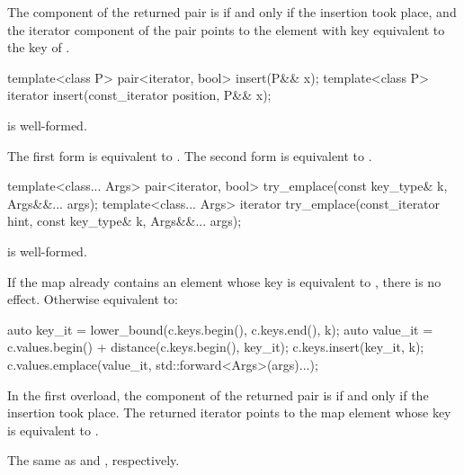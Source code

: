 \begin{codeblock}
\begin{codeblock}
\begin{codeblock}
\begin{addedblock}
\begin{itemdescr}
\pnum
\returns
The  component of the returned pair is  if and only if
the insertion took place, and the iterator component of the pair points to the
element with key equivalent to the key of .
\end{itemdescr}

%
\begin{itemdecl}
template<class P> pair<iterator, bool> insert(P&& x);
template<class P> iterator insert(const_iterator position, P&& x);
\end{itemdecl}

\begin{itemdescr}
\pnum \constraints {} is well-formed.

\pnum
\effects
The first form is equivalent to
. The second form is
equivalent to .
\end{itemdescr}

%
\begin{itemdecl}
template<class... Args>
  pair<iterator, bool> try_emplace(const key_type& k, Args&&... args);
template<class... Args>
  iterator try_emplace(const_iterator hint, const key_type& k, Args&&... args);
\end{itemdecl}

\begin{itemdescr}
\pnum \constraints {} is well-formed.

\pnum
\effects
If the map already contains an element whose key is equivalent to ,
there is no effect.  Otherwise equivalent to:
\begin{codeblock}
auto key_it = lower_bound(c.keys.begin(), c.keys.end(), k);
auto value_it = c.values.begin() + distance(c.keys.begin(), key_it);
c.keys.insert(key_it, k);
c.values.emplace(value_it, std::forward<Args>(args)...);
\end{codeblock}

\pnum
\returns
In the first overload, the  component of the returned pair
is  if and only if the insertion took place.  The returned
iterator points to the map element whose key is equivalent to .

\pnum
\complexity
The same as  and ,
respectively.
\end{itemdescr}


\end{addedblock}
\end{codeblock}
\end{codeblock}
\end{codeblock}
